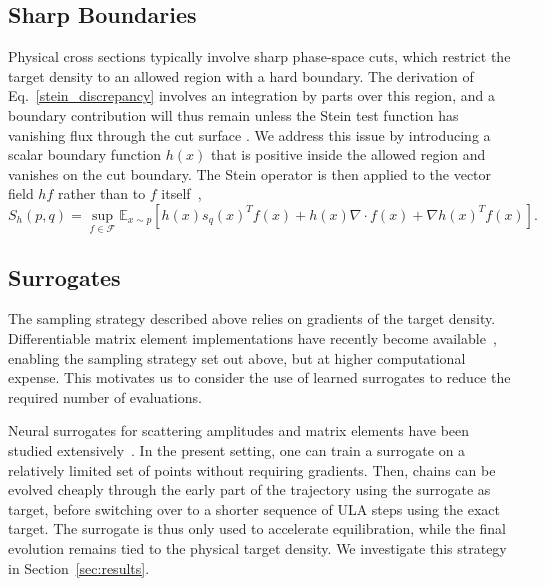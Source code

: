 \documentclass[11pt]{article}
\begin{document}
\subsection{Sharp Boundaries}
\label{sharp_boundaries_section}
Physical cross sections typically involve sharp phase-space cuts, which restrict the target density to an allowed region with a hard boundary. 
The derivation of Eq.~\ref{stein_discrepancy} involves an integration by parts over this region, and a boundary contribution will thus remain unless the Stein test function has vanishing flux through the cut surface \cite{liu2022estimating,williams2023approximate}. 
We address this issue by introducing a scalar boundary function $h(x)$ that is positive inside the allowed region and vanishes on the cut boundary.
The Stein operator is then applied to the vector field $h f$ rather than to $f$ itself~\cite{liu2022estimating,xu2022standardisation},
\begin{equation}
  S_h(p,q) = \sup_{f \in \mathcal{F}} \mathbb{E}_{x\sim p} \left[h(x) s_q(x)^T f(x) + h(x) \nabla \cdot f(x) + \nabla h(x)^T f(x)\right].
\end{equation}

\subsection{Surrogates}
The sampling strategy described above relies on gradients of the target density.
Differentiable matrix element implementations have recently become available~\cite{Heinrich:2022xfa,Carrazza:2021zug,Carrazza:2021gpx,Heimel:2024wph,Heimel:2026hgp}, enabling the sampling strategy set out above, but at higher computational expense. 
This motivates us to consider the use of learned surrogates to reduce the required number of evaluations.

Neural surrogates for scattering amplitudes and matrix elements have been studied extensively~\cite{Bishara:2019iwh,Badger:2020uow,Aylett-Bullock:2021hmo,Maitre:2021uaa,Danziger:2021eeg,Badger:2022hwf,Janssen:2023ahv,Maitre:2023dqz,Bahl:2024gyt,Brehmer:2024yqw,Breso-Pla:2024pda,Herrmann:2025nnz,Bahl:2025xvx,Favaro:2025pgz,Villadamigo:2025our,Beccatini:2025tpk,Bahl:2026jvt,Bahl:2026qaf}.
In the present setting, one can train a surrogate on a relatively limited set of points without requiring gradients.
Then, chains can be evolved cheaply through the early part of the trajectory using the surrogate as target, before switching over to a shorter sequence of ULA steps using the exact target. 
The surrogate is thus only used to accelerate equilibration, while the final evolution remains tied to the physical target density.
We investigate this strategy in Section~\ref{sec:results}.
\end{document}
